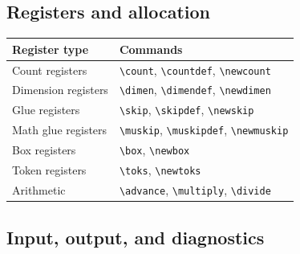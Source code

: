 \documentclass[11pt]{article}
\begin{document}
\subsection{Registers and allocation}\label{registers-and-allocation}

\begin{longtable}[]{@{}ll@{}}
\toprule\noalign{}
Register type & Commands \\
\midrule\noalign{}
\endhead
\bottomrule\noalign{}
\endlastfoot
Count registers & \texttt{\textbackslash{}count}, \texttt{\textbackslash{}countdef}, \texttt{\textbackslash{}newcount} \\
Dimension registers & \texttt{\textbackslash{}dimen}, \texttt{\textbackslash{}dimendef}, \texttt{\textbackslash{}newdimen} \\
Glue registers & \texttt{\textbackslash{}skip}, \texttt{\textbackslash{}skipdef}, \texttt{\textbackslash{}newskip} \\
Math glue registers & \texttt{\textbackslash{}muskip}, \texttt{\textbackslash{}muskipdef}, \texttt{\textbackslash{}newmuskip} \\
Box registers & \texttt{\textbackslash{}box}, \texttt{\textbackslash{}newbox} \\
Token registers & \texttt{\textbackslash{}toks}, \texttt{\textbackslash{}newtoks} \\
Arithmetic & \texttt{\textbackslash{}advance}, \texttt{\textbackslash{}multiply}, \texttt{\textbackslash{}divide} \\
\end{longtable}

\subsection{Input, output, and diagnostics}\label{input-output-and-diagnostics}
\end{document}
